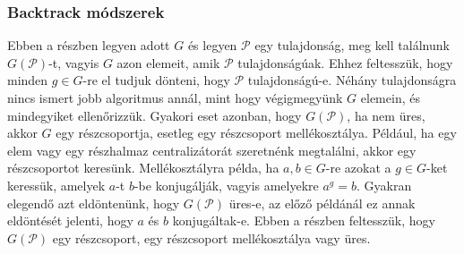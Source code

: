 \subsubsection{Backtrack módszerek}
\label{subsubsec:permbt}
Ebben a részben legyen adott $G$ és legyen $\mathcal{P}$ egy tulajdonság, meg kell találnunk $G(\mathcal{P})$-t, vagyis $G$ azon elemeit, amik $\mathcal{P}$ tulajdonságúak.
Ehhez feltesszük, hogy minden $g \in G$-re el tudjuk dönteni, hogy $\mathcal{P}$ tulajdonságú-e.
Néhány tulajdonságra nincs ismert jobb algoritmus annál, mint hogy végigmegyünk $G$ elemein, és mindegyiket ellenőrizzük.
Gyakori eset azonban, hogy $G(\mathcal{P})$, ha nem üres, akkor $G$ egy részcsoportja, esetleg egy részcsoport mellékosztálya.
Például, ha egy elem vagy egy részhalmaz centralizátorát szeretnénk megtalálni, akkor egy részcsoportot keresünk.
Mellékosztályra példa, ha $a, b \in G$-re azokat a $g \in G$-ket keressük, amelyek $a$-t $b$-be konjugálják, vagyis amelyekre $a^g = b$.
Gyakran elegendő azt eldöntenünk, hogy $G(\mathcal{P})$ üres-e, az előző példánál ez annak eldöntését jelenti, hogy $a$ és $b$ konjugáltak-e.
Ebben a részben feltesszük, hogy $G(\mathcal{P})$ egy részcsoport, egy részcsoport mellékosztálya vagy üres.

